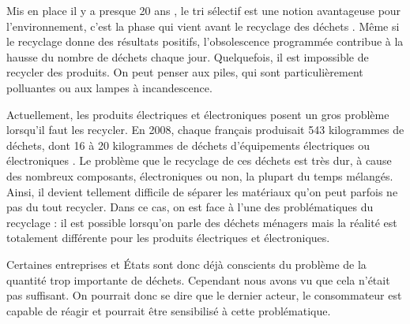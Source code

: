 \bigbreak
Mis en place il y a presque 20 ans , le tri sélectif est une notion avantageuse pour l’environnement, c'est la phase qui vient avant le recyclage des déchets \cite{tri}. Même si le recyclage donne des résultats positifs, l’obsolescence programmée contribue à la hausse du nombre de déchets chaque jour. Quelquefois, il est impossible de recycler des produits. On peut penser aux piles, qui sont particulièrement polluantes ou aux lampes à incandescence.

Actuellement, les produits électriques et électroniques posent un gros problème lorsqu'il faut les recycler. En 2008, chaque français produisait 543 kilogrammes de déchets, dont 16 à 20 kilogrammes de déchets d’équipements électriques ou électroniques \cite{opSsg}. Le problème que le recyclage de ces déchets est très dur, à cause des nombreux composants, électroniques ou non, la plupart du temps mélangés. Ainsi, il devient tellement difficile de séparer les matériaux qu'on peut parfois ne pas du tout recycler. Dans ce cas, on est face à l'une des problématiques du recyclage : il est possible lorsqu'on parle des déchets ménagers mais la réalité est totalement différente pour les produits électriques et électroniques. 


\bigbreak
Certaines entreprises et États sont donc déjà conscients du problème de la quantité trop importante de déchets. Cependant nous avons vu que cela n'était pas suffisant. On pourrait donc se dire que le dernier acteur, le consommateur est capable de réagir et pourrait être sensibilisé à cette problématique.
